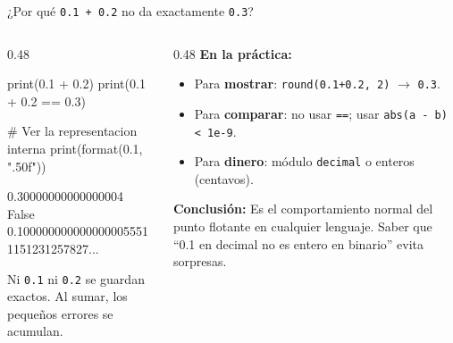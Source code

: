 \documentclass[aspectratio=169, 11pt]{beamer}
\begin{document}
\begin{frame}[fragile,shrink=25]{¿Por qué \texttt{0.1 + 0.2} no da exactamente \texttt{0.3}?}
  \vspace{-6pt}
  \begin{columns}[T]
    \begin{column}{0.48\textwidth}
      \begin{pyblock}
print(0.1 + 0.2)
print(0.1 + 0.2 == 0.3)

# Ver la representacion interna
print(format(0.1, ".50f"))
      \end{pyblock}
      \vspace{-2pt}
      \begin{outputblock}
0.30000000000000004
False
0.1000000000000000055511151231257827...
      \end{outputblock}

      \vspace{4pt}
      {\scriptsize\color{textMuted}
      Ni \texttt{0.1} ni \texttt{0.2} se guardan exactos.
      Al sumar, los pequeños errores se acumulan.}
    \end{column}

    \begin{column}{0.48\textwidth}
      \vspace{2pt}
      {\footnotesize\color{arcaDark}\bfseries En la práctica:}
      {\scriptsize\color{textMuted}
      \begin{itemize}\setlength{\itemsep}{4pt}
        \item Para \textbf{mostrar}: \texttt{round(0.1+0.2, 2)} $\rightarrow$ \texttt{0.3}.
        \item Para \textbf{comparar}: no usar \texttt{==}; usar
          \texttt{abs(a - b) < 1e-9}.
        \item Para \textbf{dinero}: módulo \texttt{decimal} o
          enteros (centavos).
      \end{itemize}
      }

      \vspace{6pt}
      {\footnotesize\color{arcaDark}\bfseries Conclusión:}
      {\scriptsize\color{textMuted}
      Es el comportamiento normal del punto flotante en cualquier lenguaje.
      Saber que ``0.1 en decimal no es entero en binario'' evita sorpresas.}
    \end{column}
  \end{columns}
\end{frame}
\end{document}
